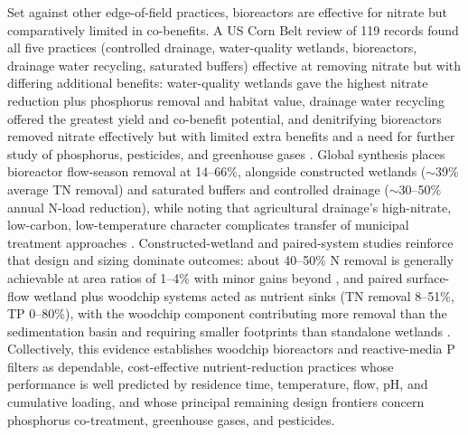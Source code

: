 \documentclass[11pt]{article}
\begin{document}
Set against other edge-of-field practices, bioreactors are effective for nitrate but comparatively limited in co-benefits. A US Corn Belt review of 119 records found all five practices (controlled drainage, water-quality wetlands, bioreactors, drainage water recycling, saturated buffers) effective at removing nitrate but with differing additional benefits: water-quality wetlands gave the highest nitrate reduction plus phosphorus removal and habitat value, drainage water recycling offered the greatest yield and co-benefit potential, and denitrifying bioreactors removed nitrate effectively but with limited extra benefits and a need for further study of phosphorus, pesticides, and greenhouse gases \parencite{Mitchell2023}. Global synthesis places bioreactor flow-season removal at 14--66\%, alongside constructed wetlands ($\sim$39\% average TN removal) and saturated buffers and controlled drainage ($\sim$30--50\% annual N-load reduction), while noting that agricultural drainage's high-nitrate, low-carbon, low-temperature character complicates transfer of municipal treatment approaches \parencite{Wang2025b}. Constructed-wetland and paired-system studies reinforce that design and sizing dominate outcomes: about 40--50\% N removal is generally achievable at area ratios of 1--4\% with minor gains beyond \parencite{Mendes2021}, and paired surface-flow wetland plus woodchip systems acted as nutrient sinks (TN removal 8--51\%, TP 0--80\%), with the woodchip component contributing more removal than the sedimentation basin and requiring smaller footprints than standalone wetlands \parencite{Pugliese2020}. Collectively, this evidence establishes woodchip bioreactors and reactive-media P filters as dependable, cost-effective nutrient-reduction practices whose performance is well predicted by residence time, temperature, flow, pH, and cumulative loading, and whose principal remaining design frontiers concern phosphorus co-treatment, greenhouse gases, and pesticides.

\printbibliography
\end{document}
